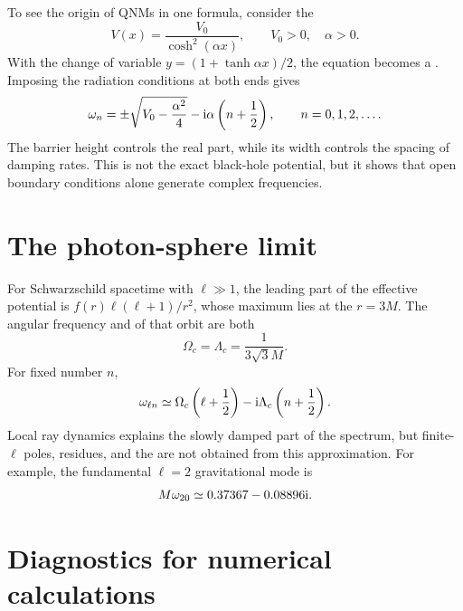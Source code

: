 To see the origin of QNMs in one formula, consider the 
\begin{equation}
V(x)
=
\frac{V_0}{\cosh^2(\alpha x)},
\qquad
V_0>0,
\quad
\alpha>0.
\label{eq:poschl_teller_potential}
\end{equation}
With the change of variable $y=(1+\tanh\alpha x)/2$, the equation becomes a . Imposing the radiation conditions at both ends gives
\begin{equation}
\omega_n
=
\mathord{\pm}
\sqrt{V_0-\frac{\alpha^2}{4}}
-\mathrm{i}\alpha\left(n+\frac{1}{2}\right),
\qquad
n=0,1,2,\ldots.
\label{eq:poschl_teller_qnm}
\end{equation}
The barrier height controls the real part, while its width controls the spacing of damping rates. This is not the exact black-hole potential, but it shows that open boundary conditions alone generate complex frequencies.

\section{The photon-sphere limit}

For Schwarzschild spacetime with $\ell\gg1$, the leading part of the effective potential is $f(r)\ell(\ell+1)/r^2$, whose maximum lies at the  $r=3M$. The angular frequency and  of that orbit are both
\begin{equation}
\Omega_c
=
\Lambda_c
=
\frac{1}{3\sqrt{3}M}.
\end{equation}
For fixed  number $n$,
\begin{equation}
\omega_{\ell n}
\simeq
\Omega_c\left(\ell+\frac{1}{2}\right)
-\mathrm{i}\Lambda_c\left(n+\frac{1}{2}\right).
\label{eq:eikonal_qnm}
\end{equation}
Local ray dynamics explains the slowly damped part of the spectrum, but finite-$\ell$ poles, residues, and the  are not obtained from this approximation. For example, the fundamental $\ell=2$ gravitational mode is
\begin{equation}
M\omega_{20}
\simeq
0.37367-0.08896\mathrm{i}.
\label{eq:schwarzschild_fundamental_qnm}
\end{equation}
\cite{Berti:2009kk}

\section{Diagnostics for numerical calculations}

